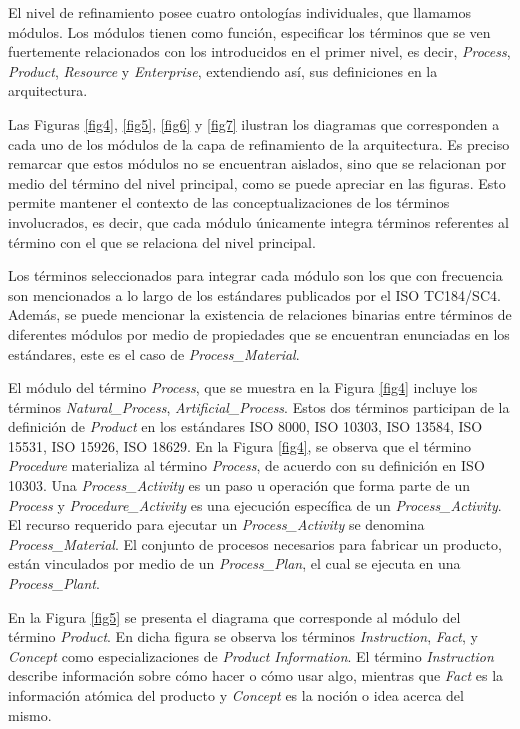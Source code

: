 \documentclass[journal]{IEEEtran}
\begin{document}
El nivel de refinamiento posee cuatro ontolog\'ias individuales, que llamamos m\'odulos. Los m\'odulos tienen como funci\'on, especificar los t\'erminos que se ven fuertemente relacionados con los introducidos en el primer nivel, es decir, \emph{Process}, \emph{Product}, \emph{Resource} y \emph{Enterprise}, extendiendo as\'i, sus definiciones en la arquitectura.

Las Figuras \ref{fig4}, \ref{fig5}, \ref{fig6} y \ref{fig7} ilustran los diagramas que corresponden a cada uno de los m\'odulos de la capa de refinamiento de la arquitectura. Es preciso remarcar que estos m\'odulos no se encuentran aislados, sino que se relacionan por medio del t\'ermino del nivel principal, como se puede apreciar en las figuras. Esto permite mantener el contexto de las conceptualizaciones de los t\'erminos involucrados, es decir, que cada m\'odulo \'unicamente integra t\'erminos referentes al t\'ermino con el que se relaciona del nivel principal.

Los t\'erminos seleccionados para integrar cada m\'odulo son los que con frecuencia son mencionados a lo largo de los est\'andares publicados por el ISO TC184/SC4. Adem\'as, se puede mencionar la existencia de relaciones binarias entre t\'erminos de diferentes m\'odulos por medio de propiedades que se encuentran enunciadas en los est\'andares, este es el caso de \emph{Process\_Material}.

El m\'odulo del t\'ermino \emph{Process}, que se muestra en la Figura \ref{fig4} incluye los t\'erminos \emph{Natural\_Process}, \emph{Artificial\_Process}. Estos dos t\'erminos participan de la definici\'on de \emph{Product} en los est\'andares ISO 8000, ISO 10303, ISO 13584, ISO 15531, ISO 15926, ISO 18629. En la Figura \ref{fig4}, se observa que el t\'ermino \emph{Procedure} materializa al t\'ermino \emph{Process}, de acuerdo con su definici\'on en ISO 10303. Una \emph{Process\_Activity} es un paso u operaci\'on que forma parte de un \emph{Process} y \emph{Procedure\_Activity} es una ejecuci\'on espec\'ifica de un \emph{Process\_Activity}. El recurso requerido para ejecutar un \emph{Process\_Activity} se denomina \emph{Process\_Material}. El conjunto de procesos necesarios para fabricar un producto, est\'an vinculados por medio de un \emph{Process\_Plan}, el cual se ejecuta en una \emph{Process\_Plant}.

En la Figura \ref{fig5} se presenta el diagrama que corresponde al m\'odulo del t\'ermino \emph{Product}. En dicha figura se observa los t\'erminos \emph{Instruction}, \emph{Fact}, y \emph{Concept} como especializaciones de \emph{Product Information}. El t\'ermino \emph{Instruction} describe informaci\'on sobre c\'omo hacer o c\'omo usar algo, mientras que \emph{Fact} es la informaci\'on at\'omica del producto y \emph{Concept} es la noci\'on o idea acerca del mismo.
\end{document}
